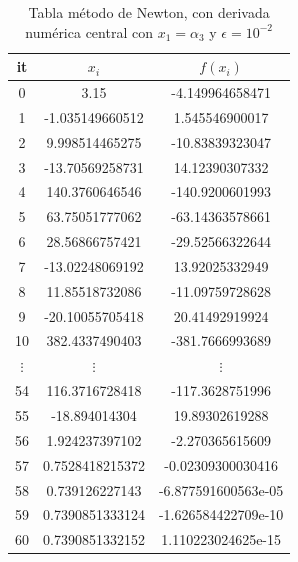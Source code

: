 \documentclass{article} %
\begin{document}
\begin{table}[H]
\centering
\begin{center}
\begin{tabular}{|c|c|c|}
\hline
it & $x_i$ & $f(x_i)$\\
\hline
0 & 3.15 & -4.149964658471\\
1 & -1.035149660512 & 1.545546900017\\
2 & 9.998514465275 & -10.83839323047\\
3 & -13.70569258731 & 14.12390307332\\
4 & 140.3760646546 & -140.9200601993\\
5 & 63.75051777062 & -63.14363578661\\
6 & 28.56866757421 & -29.52566322644\\
7 & -13.02248069192 & 13.92025332949\\
8 & 11.85518732086 & -11.09759728628\\
9 & -20.10055705418 & 20.41492919924\\
10 & 382.4337490403 & -381.7666993689\\
$\vdots$ & $\vdots$ & $\vdots$\\
54 & 116.3716728418 & -117.3628751996\\
55 & -18.894014304 & 19.89302619288\\
56 & 1.924237397102 & -2.270365615609\\
57 & 0.7528418215372 & -0.02309300030416\\
58 & 0.739126227143 & -6.877591600563e-05\\
59 & 0.7390851333124 & -1.626584422709e-10\\
60 & 0.7390851332152 & 1.110223024625e-15\\
\hline
\end{tabular}
\end{center}
\caption{Tabla método de Newton, con derivada numérica central con $x_1 = \alpha_3$ y $\epsilon = 10^{-2}$}
\end{table}
\end{document}
